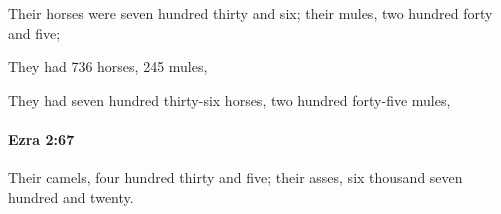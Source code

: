 			\begin{versebox}
					\item[BHS] 
					\item[LXX] 
					\item[ASV] Their horses were seven hundred thirty and six; their mules, two hundred forty and five;
					\item[NIV] They had 736 horses, 245 mules,
					\item[NRSV] They had seven hundred thirty-six horses, two hundred forty-five mules,
			\end{versebox}

		\paragraph{Ezra 2:67} %
			\label{EZRA-2-67}

			Their camels, four hundred thirty and five; their asses, six thousand seven hundred and twenty.

